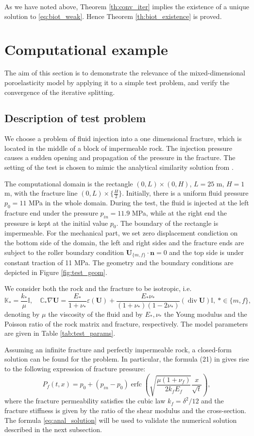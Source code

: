 \documentclass[a4paper]{article}
\numberwithin{equation}{section}
\def\div{\operatorname{div}}
\def\erfc{\operatorname{erfc}}
\def\nn{\vc n}
\def\tn#1{{\mathbb{#1}}}    %
\def\U{\vc U}
\def\vc#1{\mathbf{#1}}     %
\newcommand{\eq}[1]{\begin{equation}#1\end{equation}}
\begin{document}
% 
As we have noted above, Theorem \ref{th:conv_iter} implies the existence of a unique solution to \eqref{eq:biot_weak}.
Hence Theorem \ref{th:biot_existence} is proved.


\section{Computational example}\label{sec:comp_test}

The aim of this section is to demonstrate the relevance of the mixed-dimensional poroelasticity model by applying it to a simple test problem, and verify the convergence of the iterative splitting.

\subsection{Description of test problem}
We choose a problem of fluid injection into a one dimensional fracture, which is located in the middle of a block of impermeable rock.
The injection pressure causes a sudden opening and propagation of the pressure in the fracture.
The setting of the test is chosen to mimic the analytical similarity solution from \cite{Wijesinghe1986}.

The computational domain is the rectangle $(0,L)\times(0,H)$, $L=25$ m, $H=1$ m, with the fracture line $(0,L)\times\{\tfrac H2\}$.
Initially, there is a uniform fluid pressure $p_0=11$ MPa in the whole domain.
During the test, the fluid is injected at the left fracture end under the pressure $p_{in}=11.9$ MPa, while at the right end the pressure is kept at the initial value $p_0$.
The boundary of the rectangle is impermeable.
For the mechanical part, we set zero displacement condiction on the bottom side of the domain, the left and right sides and the fracture ends are subject to the roller boundary condition $\U_{\{m,f\}}\cdot\nn=0$ and the top side is under constant traction of 11 MPa.
The geometry and the boundary conditions are depicted in Figure \ref{fig:test_geom}.

We consider both the rock and the fracture to be isotropic, i.e.
% 
\eq{ \tn K_*=\frac{k_*}{\mu}\tn I, \quad \tn C_*\nabla\U =\frac{E_*}{1+\nu_*}\varepsilon(\U)+\frac{E_*\nu_*}{(1+\nu_*)(1-2\nu_*)}(\div\U)\tn I, ~*\in\{m,f\}, }
% 
denoting by $\mu$ the viscosity of the fluid and by $E_*,\nu_*$ the Young modulus and the Poisson ratio of the rock matrix and fracture, respectively.
The model parameters are given in Table \ref{tab:test_params}.

Assuming an infinite fracture and perfectly impermeable rock, a closed-form solution can be found for the problem.
In particular, the formula (21) in \cite{Wijesinghe1986} gives rise to the following expression of fracture pressure:
% 
\eq{ \label{eq:anal_solution} P_f(t,x) = p_0 + (p_{in}-p_0)\erfc\left(\sqrt{\frac{\mu(1+\nu_f)}{2 k_f E_f}} \frac{x}{\sqrt{t}}\right), }
%
where the fracture permeability satisfies the cubic law $k_f=\delta^2/12$ and the fracture stiffness is given by the ratio of the shear modulus and the cross-section.
The formula \eqref{eq:anal_solution} will be used to validate the numerical solution described in the next subsection.
\end{document}
